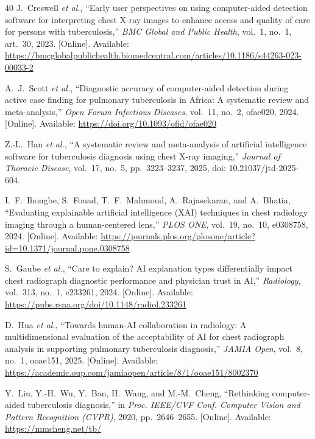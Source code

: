 \documentclass[conference, letterpaper]{IEEEtran}
\begin{document}
\begin{thebibliography}{40}
J.~Creswell \textit{et al.}, ``Early user perspectives on using computer-aided detection software for interpreting chest X-ray images to enhance access and quality of care for persons with tuberculosis,'' \textit{BMC Global and Public Health}, vol.~1, no.~1, art.~30, 2023. [Online]. Available: \url{https://bmcglobalpublichealth.biomedcentral.com/articles/10.1186/s44263-023-00033-2}

A.~J.~Scott \textit{et al.}, ``Diagnostic accuracy of computer-aided detection during active case finding for pulmonary tuberculosis in Africa: A systematic review and meta-analysis,'' \textit{Open Forum Infectious Diseases}, vol.~11, no.~2, ofae020, 2024. [Online]. Available: \url{https://doi.org/10.1093/ofid/ofae020}

Z.-L.~Han \textit{et al.}, ``A systematic review and meta-analysis of artificial intelligence software for tuberculosis diagnosis using chest X-ray imaging,'' \textit{Journal of Thoracic Disease}, vol.~17, no.~5, pp.~3223--3237, 2025, doi: 10.21037/jtd-2025-604.

I.~F.~Ihongbe, S.~Fouad, T.~F.~Mahmoud, A.~Rajasekaran, and A.~Bhatia, ``Evaluating explainable artificial intelligence (XAI) techniques in chest radiology imaging through a human-centered lens,'' \textit{PLOS ONE}, vol.~19, no.~10, e0308758, 2024. [Online]. Available: \url{https://journals.plos.org/plosone/article?id=10.1371/journal.pone.0308758}

S.~Gaube \textit{et al.}, ``Care to explain? AI explanation types differentially impact chest radiograph diagnostic performance and physician trust in AI,'' \textit{Radiology}, vol.~313, no.~1, e233261, 2024. [Online]. Available: \url{https://pubs.rsna.org/doi/10.1148/radiol.233261}

D.~Hua \textit{et al.}, ``Towards human-AI collaboration in radiology: A multidimensional evaluation of the acceptability of AI for chest radiograph analysis in supporting pulmonary tuberculosis diagnosis,'' \textit{JAMIA Open}, vol.~8, no.~1, ooae151, 2025. [Online]. Available: \url{https://academic.oup.com/jamiaopen/article/8/1/ooae151/8002370}

Y.~Liu, Y.-H.~Wu, Y.~Ban, H.~Wang, and M.-M.~Cheng, ``Rethinking computer-aided tuberculosis diagnosis,'' in \textit{Proc. IEEE/CVF Conf. Computer Vision and Pattern Recognition (CVPR)}, 2020, pp.~2646--2655. [Online]. Available: \url{https://mmcheng.net/tb/}


\end{thebibliography}
\end{document}
